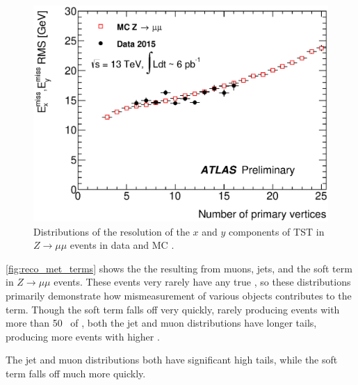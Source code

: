 \begin{centering}
\begin{figure}[!hbt]
\myfloatalign
\includegraphics[width=.9\linewidth]{figures/reco/met_fig_04b.eps}
\caption{ Distributions of the resolution of the $x$ and $y$ components of \ac{TST} \met in $Z\rightarrow\mu\mu$ events in data and \ac{MC} \cite{ATL-PHYS-PUB-2015-027}. }
\label{fig:reco_met_tst}
\end{figure}
\end{centering}

\autoref{fig:reco_met_terms} shows the the \met resulting from muons, jets, and the soft term in $Z\rightarrow\mu\mu$ events. These events very rarely have any true \met, so these distributions primarily demonstrate how mismeasurement of various objects contributes to the \met term. Though the soft term falls off very quickly, rarely producing events with more than 50 \gev~of \met, both the jet and muon distributions have longer tails, producing more events with higher \met. 

The jet and muon distributions both have significant high tails, while the soft term falls off much more quickly. 


